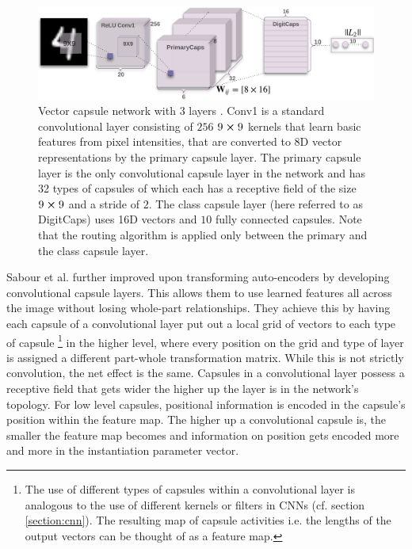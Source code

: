 \begin{figure}
    \centering
    \includegraphics[width=\textwidth]{figures/vector-capsules.png}
\caption[Vector capsule network with 3 layers]{Vector capsule network with 3 layers \cite{sabour2017dynamic}. Conv1 is a standard convolutional layer consisting of $\num{256}$ $9\cross9$ kernels that learn basic features from pixel intensities, that are converted to 8D vector representations by the primary capsule layer. The primary capsule layer is the only convolutional capsule layer in the network and has 32 types of capsules of which each has a receptive field of the size $9\cross9$ and a stride of $\num{2}$. The class capsule layer (here referred to as DigitCaps) uses 16D vectors and $\num{10}$ fully connected capsules. Note that the routing algorithm is applied only between the primary and the class capsule layer.}\label{fig:vector-capsules}
\end{figure}\noindent

Sabour et al. further improved upon transforming auto-encoders by developing convolutional capsule layers. This allows them to use learned features all across the image without losing whole-part relationships. They achieve this by having each capsule of a convolutional layer put out a local grid of vectors to each type of capsule \footnote{The use of different types of capsules within a convolutional layer is analogous to the use of different kernels or filters in CNNs (cf. section \ref{section:cnn}). The resulting map of capsule activities i.e. the lengths of the output vectors can be thought of as a feature map.} in the higher level, where every position on the grid and type of layer is assigned a different part-whole transformation matrix. While this is not strictly convolution, the net effect is the same. Capsules in a convolutional layer possess a receptive field that gets wider the higher up the layer is in the network's topology. For low level capsules, positional information is encoded in the capsule's position within the feature map. The higher up a convolutional capsule is, the smaller the feature map becomes and information on position gets encoded more and more in the instantiation parameter vector.

